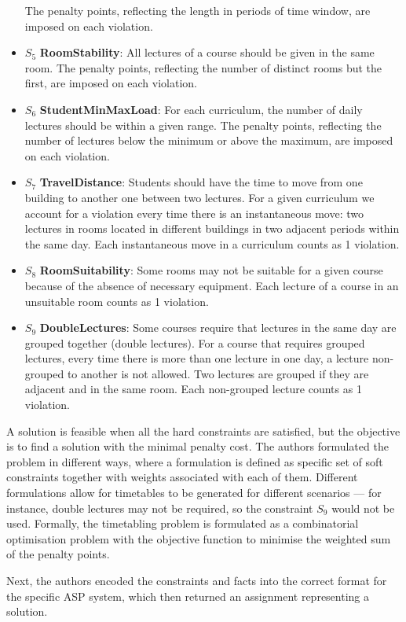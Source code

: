 \documentclass[a4paper, 12pt]{report}
\begin{document}
\begin{itemize}
		The penalty points, reflecting the length in periods of time window, are
		imposed on each violation.
	\item \( S_5 \) \textbf{RoomStability}: All lectures of a course should be
		given in the same room.
		The penalty points, reflecting the number of distinct rooms but the
		first, are imposed on each violation.
	\item \( S_6 \) \textbf{StudentMinMaxLoad}: For each curriculum, the number
		of daily lectures should be within a given range.
		The penalty points, reflecting the number of lectures below the minimum
		or above the maximum, are imposed on each violation.
	\item \( S_7 \) \textbf{TravelDistance}: Students should have the time to
		move from one building to another one between two lectures.
		For a given curriculum we account for a violation every time there is an
		instantaneous move: two lectures in rooms located in different buildings
		in two adjacent periods within the same day.
		Each instantaneous move in a curriculum counts as 1 violation.
	\item \( S_8 \) \textbf{RoomSuitability}: Some rooms may not be suitable for
		a given course because of the absence of necessary equipment.
		Each lecture of a course in an unsuitable room counts as 1 violation.
	\item \( S_9 \) \textbf{DoubleLectures}: Some courses require that lectures
		in the same day are grouped together (double lectures).
		For a course that requires grouped lectures, every time there is more
		than one lecture in one day, a lecture non-grouped to another is not
		allowed.
		Two lectures are grouped if they are adjacent and in the same room.
		Each non-grouped lecture counts as 1 violation.
\end{itemize}
A solution is feasible when all the hard constraints are satisfied, but the
objective is to find a solution with the minimal penalty cost.
The authors formulated the problem in different ways, where a formulation is
defined as specific set of soft constraints together with weights associated
with each of them.
Different formulations allow for timetables to be generated for different
scenarios --- for instance, double lectures may not be required, so the 
constraint \( S_9 \) would not be used.
Formally, the timetabling problem is formulated as a combinatorial optimisation
problem with the objective function to minimise the weighted sum of the penalty
points.

Next, the authors encoded the constraints and facts into the correct format 
for the specific ASP system, which then returned an assignment representing a
solution.
\end{document}
